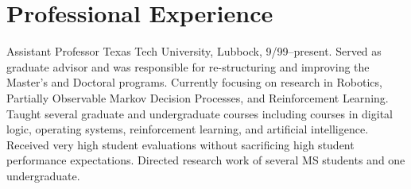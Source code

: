 

\section{Professional Experience}
{Assistant Professor} {Texas Tech University, Lubbock, 9/99--present.
  Served as graduate advisor and was responsible for re-structuring and
  improving the Master's and Doctoral programs.  Currently focusing on
  research in Robotics, Partially Observable Markov Decision Processes, and
  Reinforcement Learning.  Taught several graduate and undergraduate
  courses including courses in digital logic, operating systems,
  reinforcement learning, and artificial intelligence.  Received very high
  student evaluations without sacrificing high student performance
  expectations.  Directed research work of several MS students
  and one undergraduate.}

